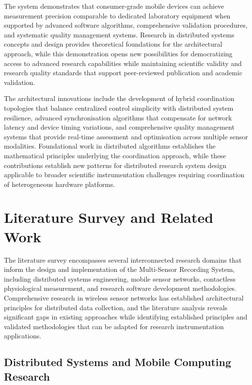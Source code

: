 \documentclass[11pt,a4paper]{report}
\begin{document}
The system demonstrates that consumer-grade mobile devices can achieve measurement precision comparable to dedicated laboratory equipment when supported by advanced software algorithms, comprehensive validation procedures, and systematic quality management systems. Research in distributed systems concepts and design provides theoretical foundations for the architectural approach, while this demonstration opens new possibilities for democratizing access to advanced research capabilities while maintaining scientific validity and research quality standards that support peer-reviewed publication and academic validation.

The architectural innovations include the development of hybrid coordination topologies that balance centralized control simplicity with distributed system resilience, advanced synchronisation algorithms that compensate for network latency and device timing variations, and comprehensive quality management systems that provide real-time assessment and optimisation across multiple sensor modalities. Foundational work in distributed algorithms establishes the mathematical principles underlying the coordination approach, while these contributions establish new patterns for distributed research system design applicable to broader scientific instrumentation challenges requiring coordination of heterogeneous hardware platforms.

\section{Literature Survey and Related Work}

The literature survey encompasses several interconnected research domains that inform the design and implementation of the Multi-Sensor Recording System, including distributed systems engineering, mobile sensor networks, contactless physiological measurement, and research software development methodologies. Comprehensive research in wireless sensor networks has established architectural principles for distributed data collection, and the literature analysis reveals significant gaps in existing approaches while identifying established principles and validated methodologies that can be adapted for research instrumentation applications.

\subsection{Distributed Systems and Mobile Computing Research}
\end{document}
